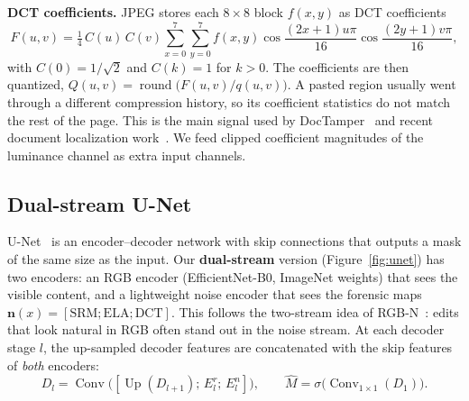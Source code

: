 \documentclass[11pt,a4paper]{article}
\begin{document}
\textbf{DCT coefficients.} JPEG stores each $8{\times}8$ block $f(x,y)$ as DCT coefficients
\begin{equation}
  F(u,v)=\tfrac14\,C(u)\,C(v)\sum_{x=0}^{7}\sum_{y=0}^{7} f(x,y)
  \cos\frac{(2x+1)u\pi}{16}\cos\frac{(2y+1)v\pi}{16},
  \label{eq:dct}
\end{equation}
with $C(0)=1/\sqrt2$ and $C(k)=1$ for $k>0$. The coefficients are then quantized, $Q(u,v)=\operatorname{round}\bigl(F(u,v)/q(u,v)\bigr)$. A pasted region
usually went through a different compression history, so its coefficient statistics do not
match the rest of the page. This is the main signal used by DocTamper~\cite{doctamper} and recent
document localization work~\cite{dhouib2026}. We feed clipped coefficient magnitudes of the
luminance channel as extra input channels.

\subsection{Dual-stream U-Net}
U-Net~\cite{unet} is an encoder--decoder network with skip connections that outputs a mask of the
same size as the input. Our \textbf{dual-stream} version (Figure~\ref{fig:unet}) has two encoders:
an RGB encoder (EfficientNet-B0, ImageNet weights) that sees the visible content, and a
lightweight noise encoder that sees the forensic maps $\mathbf{n}(x)=[\text{SRM};\text{ELA};\text{DCT}]$.
This follows the two-stream idea of RGB-N~\cite{rgbn}: edits that look natural in RGB often stand
out in the noise stream. At each decoder stage $l$, the up-sampled decoder features are
concatenated with the skip features of \emph{both} encoders:
\begin{equation}
  D_l=\operatorname{Conv}\bigl([\operatorname{Up}(D_{l+1});\,E^{r}_{l};\,E^{n}_{l}]\bigr),\qquad
  \hat M=\sigma\bigl(\operatorname{Conv}_{1\times1}(D_1)\bigr).
\end{equation}
\end{document}
